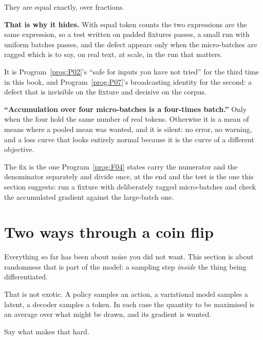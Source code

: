 \begin{fr}
\begin{ansblock}
They are equal \dash{} exactly, over fractions.
\end{ansblock}

\textbf{That is why it hides.} With equal token counts the two expressions are
the
same expression, so a test written on padded fixtures passes, a small run with
uniform batches passes, and the defect appears only when the micro-batches are
ragged \dash{} which is to say, on real text, at scale, in the run that
matters.

It is Program~\ref{prog:P02}'s \enquote{safe for inputs you have not tried} for
the third time in this book, and Program~\ref{prog:P07}'s broadcasting identity
for the second: a defect that is invisible on the fixture and decisive on the
corpus.
\end{fr}

\begin{fr}
\begin{trapbox}
\textbf{\enquote{Accumulation over four micro-batches is a four-times batch.}}
Only when the four hold the same number of real tokens. Otherwise it is a mean
of means where a pooled mean was wanted, and it is silent: no error, no
warning, and a loss curve that looks entirely normal because it is the curve
of a different objective.

The fix is the one Program~\ref{prog:F04} states \dash{} carry the numerator
and the denominator separately and divide once, at the end \dash{} and the
test is the one this section suggests: run a fixture with deliberately ragged
micro-batches and check the accumulated gradient against the large-batch one.
\end{trapbox}
\end{fr}

\section{Two ways through a coin flip}
\label{sec:P21-estimators}

\begin{fr}
Everything so far has been about noise you did not want. This section is about
randomness that is part of the model: a sampling step \emph{inside} the thing
being differentiated.

That is not exotic. A policy samples an action, a variational model samples a
latent, a decoder samples a token. In each case the quantity to be maximised
is an average over what might be drawn, and its gradient is wanted.

Say what makes that hard.
\dotline
\nextframe
\end{fr}

